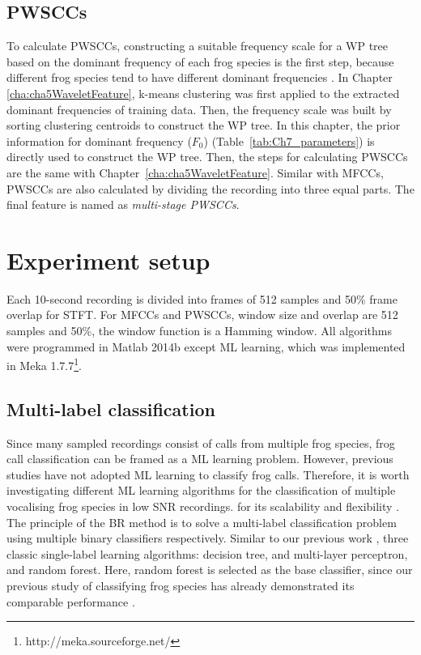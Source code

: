 \subsection{PWSCCs}
To calculate PWSCCs, constructing a suitable frequency scale for a WP tree based on the dominant frequency of each frog species is the first step, because different frog species tend to have different dominant frequencies \citep{Gingras2013}. In Chapter \ref{cha:cha5WaveletFeature}, k-means clustering was first applied to the extracted dominant frequencies of training data. Then, the frequency scale was built by sorting clustering centroids to construct the WP tree. In this chapter, the prior information for dominant frequency ($F_{0}$) (Table~\ref{tab:Ch7_parameters}) is directly used to construct the WP tree. Then, the steps for calculating PWSCCs are the same with Chapter~\ref{cha:cha5WaveletFeature}. Similar with MFCCs, PWSCCs are also calculated by dividing the recording into three equal parts. The final feature is named as \textit{multi-stage PWSCCs}.



\section{Experiment setup}
Each 10-second recording is divided into frames of 512 samples and 50\% frame overlap for STFT. For MFCCs and PWSCCs, window size and overlap are 512 samples and 50\%, the window function is a Hamming window. All algorithms were programmed in Matlab 2014b except ML learning, which was implemented in Meka 1.7.7\footnote[4]{http://meka.sourceforge.net/}. 



\subsection{Multi-label classification} 
Since many sampled recordings consist of calls from multiple frog species, frog call classification can be framed as a ML learning problem. However, previous studies have not adopted ML learning to classify frog calls. Therefore, it is worth investigating different ML learning algorithms for the classification of multiple vocalising frog species in low SNR recordings. for its scalability and flexibility \citep{read2011classifier}. The principle of the BR method is to solve a multi-label classification problem using multiple binary classifiers respectively. Similar to our previous work \citep{zhang2016using}, 
three classic single-label learning algorithms: decision tree, and multi-layer perceptron, and random forest. Here, random forest is selected as the base classifier, since our previous study of classifying frog species has already demonstrated its comparable performance \citep{xie2016acoustic}. 




